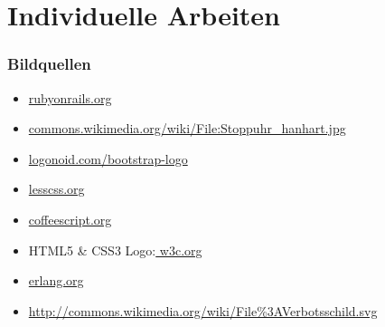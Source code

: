 \documentclass{beamer}
\begin{document}
\section{Individuelle Arbeiten}






\begin{frame}
\frametitle{Bildquellen}
\begin{itemize}
	\item \url{rubyonrails.org}
	\item \url{commons.wikimedia.org/wiki/File:Stoppuhr_hanhart.jpg}
	\item \url{logonoid.com/bootstrap-logo}
	\item \url{lesscss.org}
	\item \url{coffeescript.org}
	\item HTML5 \& CSS3 Logo:\url{ w3c.org}
	\item \url{erlang.org}
	\item \url{http://commons.wikimedia.org/wiki/File\%3AVerbotsschild.svg}
\end{itemize}
\end{frame}
\end{document}
